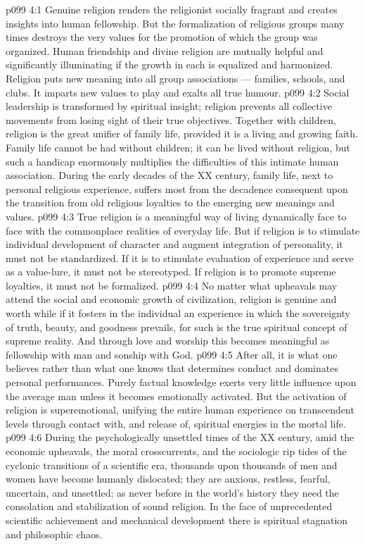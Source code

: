 \vs p099 4:1 Genuine religion renders the religionist socially fragrant and creates insights into human fellowship. But the formalization of religious groups many times destroys the very values for the promotion of which the group was organized. Human friendship and divine religion are mutually helpful and significantly illuminating if the growth in each is equalized and harmonized. Religion puts new meaning into all group associations --- families, schools, and clubs. It imparts new values to play and exalts all true humour.
\vs p099 4:2 Social leadership is transformed by spiritual insight; religion prevents all collective movements from losing sight of their true objectives. Together with children, religion is the great unifier of family life, provided it is a living and growing faith. Family life cannot be had without children; it can be lived without religion, but such a handicap enormously multiplies the difficulties of this intimate human association. During the early decades of the XX century, family life, next to personal religious experience, suffers most from the decadence consequent upon the transition from old religious loyalties to the emerging new meanings and values.
\vs p099 4:3 \pc True religion is a meaningful way of living dynamically face to face with the commonplace realities of everyday life. But if religion is to stimulate individual development of character and augment integration of personality, it must not be standardized. If it is to stimulate evaluation of experience and serve as a value\hyp{}lure, it must not be stereotyped. If religion is to promote supreme loyalties, it must not be formalized.
\vs p099 4:4 No matter what upheavals may attend the social and economic growth of civilization, religion is genuine and worth while if it fosters in the individual an experience in which the sovereignty of truth, beauty, and goodness prevails, for such is the true spiritual concept of supreme reality. And through love and worship this becomes meaningful as fellowship with man and sonship with God.
\vs p099 4:5 After all, it is what one believes rather than what one knows that determines conduct and dominates personal performances. Purely factual knowledge exerts very little influence upon the average man unless it becomes emotionally activated. But the activation of religion is superemotional, unifying the entire human experience on transcendent levels through contact with, and release of, spiritual energies in the mortal life.
\vs p099 4:6 \pc During the psychologically unsettled times of the XX century, amid the economic upheavals, the moral crosscurrents, and the sociologic rip tides of the cyclonic transitions of a scientific era, thousands upon thousands of men and women have become humanly dislocated; they are anxious, restless, fearful, uncertain, and unsettled; as never before in the world’s history they need the consolation and stabilization of sound religion. In the face of unprecedented scientific achievement and mechanical development there is spiritual stagnation and philosophic chaos.
